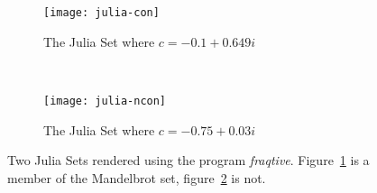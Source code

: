 \begin{figure}[h]
  \centering
  \begin{subfigure}[b]{0.48\textwidth}
    \centering    
    \texttt{[image: julia-con]}
    \caption{
      \tiny The Julia Set where \(c = -0.1 + 0.649i\)
    }
    \label{fig:juliaimgcon}
  \end{subfigure}
  ~ %
  \begin{subfigure}[b]{0.48\textwidth}
    \centering
    \texttt{[image: julia-ncon]}
    \caption{
      \tiny The Julia Set where \(c = -0.75 + 0.03i\)
    }
    \label{fig:juliaimgncon}
  \end{subfigure}
  \caption{
    Two Julia Sets rendered using the program \textit{fraqtive}\cite{fraqtive}. 
    Figure~\ref{fig:juliaimgcon} is a member of the Mandelbrot set, 
    figure~\ref{fig:juliaimgncon} is not.
  }
  \label{fig:juliaimgs}
\end{figure}
